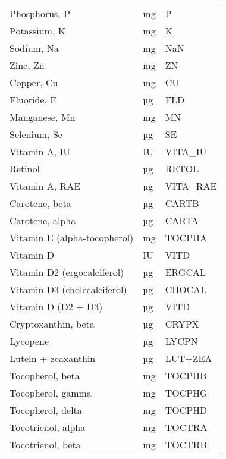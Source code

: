 \documentclass[]{scrartcl}
\begin{document}
\begin{longtable}{lll}
	Phosphorus, P                      &    mg &           P \\
	Potassium, K                       &    mg &           K \\
	Sodium, Na                         &    mg &         NaN \\
	Zinc, Zn                           &    mg &          ZN \\
	Copper, Cu                         &    mg &          CU \\
	Fluoride, F                        &    µg &         FLD \\
	Manganese, Mn                      &    mg &          MN \\
	Selenium, Se                       &    µg &          SE \\
	Vitamin A, IU                      &    IU &     VITA\_IU \\
	Retinol                            &    µg &       RETOL \\
	Vitamin A, RAE                     &    µg &    VITA\_RAE \\
	Carotene, beta                     &    µg &       CARTB \\
	Carotene, alpha                    &    µg &       CARTA \\
	Vitamin E (alpha-tocopherol)       &    mg &      TOCPHA \\
	Vitamin D                          &    IU &        VITD \\
	Vitamin D2 (ergocalciferol)        &    µg &      ERGCAL \\
	Vitamin D3 (cholecalciferol)       &    µg &      CHOCAL \\
	Vitamin D (D2 + D3)                &    µg &        VITD \\
	Cryptoxanthin, beta                &    µg &       CRYPX \\
	Lycopene                           &    µg &       LYCPN \\
	Lutein + zeaxanthin                &    µg &     LUT+ZEA \\
	Tocopherol, beta                   &    mg &      TOCPHB \\
	Tocopherol, gamma                  &    mg &      TOCPHG \\
	Tocopherol, delta                  &    mg &      TOCPHD \\
	Tocotrienol, alpha                 &    mg &      TOCTRA \\
	Tocotrienol, beta                  &    mg &      TOCTRB \\

\end{longtable}
\end{document}
